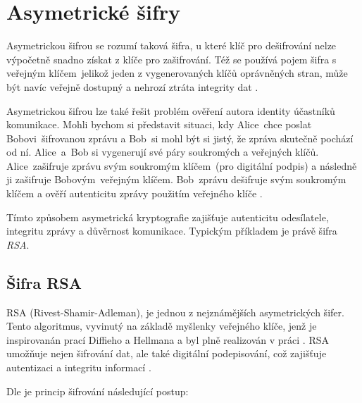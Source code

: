 \section{Asymetrické šifry}
Asymetrickou šifrou se rozumí taková šifra, u které klíč pro dešifrování nelze výpočetně snadno získat z klíče pro zašifrování. Též se používá pojem šifra s veřejným klíčem~jelikož jeden z vygenerovaných klíčů oprávněných stran, může být navíc veřejně dostupný a nehrozí ztráta integrity dat \parencite{tesar2021}.

Asymetrickou šifrou lze také řešit problém ověření autora identity účastníků komunikace. Mohli bychom si představit situaci, kdy Alice~chce poslat Bobovi~šifrovanou zprávu a Bob~si mohl být si jistý, že zpráva skutečně pochází od ní. Alice~a~Bob si vygenerují své páry soukromých a veřejných klíčů. Alice~zašifruje zprávu svým soukromým klíčem~(pro digitální podpis) a následně ji zašifruje Bobovým~veřejným klíčem. Bob~zprávu dešifruje svým soukromým klíčem a ověří autenticitu zprávy použitím veřejného klíče \parencite{burda2019}.

Tímto způsobem asymetrická kryptografie zajišťuje autenticitu odesílatele, integritu zprávy a důvěrnost komunikace. Typickým příkladem je právě šifra \emph{RSA}.

\subsection{Šifra RSA}
RSA (Rivest-Shamir-Adleman), je jednou z nejznámějších asymetrických šifer. Tento algoritmus, vyvinutý na základě myšlenky veřejného klíče, jenž je inspirovanán prací Diffieho a Hellmana \parencite{diffie1976} a byl plně realizován v práci \textcite{rsa1978}. RSA umožňuje nejen šifrování dat, ale také digitální podepisování, což zajišťuje autentizaci a integritu informací \parencite{tesar2021}.

Dle \textcite{rsa1978} je princip šifrování následující postup:

